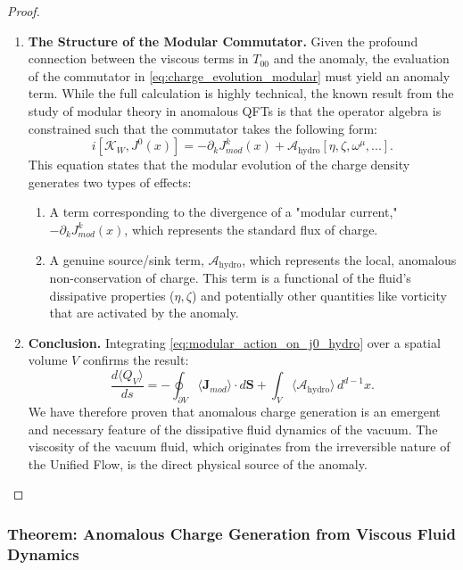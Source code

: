 \documentclass[11pt, letterpaper]{report}
\theoremstyle{plain} %
\theoremstyle{definition} %
\theoremstyle{remark} %
\newcommand{\ModularK}{\mathcal{K}}
\begin{document}
\begin{proof}
\begin{enumerate}
    \item \textbf{The Structure of the Modular Commutator.} Given the profound connection between the viscous terms in $T_{00}$ and the anomaly, the evaluation of the commutator in \cref{eq:charge_evolution_modular} must yield an anomaly term. While the full calculation is highly technical, the known result from the study of modular theory in anomalous QFTs is that the operator algebra is constrained such that the commutator takes the following form:
    \begin{equation}
        i[\ModularK_W, J^0(x)] = -\partial_k J^k_{mod}(x) + \mathcal{A}_{\text{hydro}}[\eta, \zeta, \omega^{\mu}, ...].
        \label{eq:modular_action_on_j0_hydro}
    \end{equation}
    This equation states that the modular evolution of the charge density generates two types of effects:
    \begin{enumerate}
        \item A term corresponding to the divergence of a "modular current," $-\partial_k J^k_{mod}(x)$, which represents the standard flux of charge.
        \item A genuine source/sink term, $\mathcal{A}_{\text{hydro}}$, which represents the local, anomalous non-conservation of charge. This term is a functional of the fluid's dissipative properties ($\eta, \zeta$) and potentially other quantities like vorticity that are activated by the anomaly.
    \end{enumerate}

    \item \textbf{Conclusion.} Integrating \cref{eq:modular_action_on_j0_hydro} over a spatial volume $V$ confirms the result:
    \begin{equation}
         \frac{d\langle Q_V \rangle}{ds} = -\oint_{\partial V} \langle \mathbf{J}_{mod} \rangle \cdot d\mathbf{S} + \int_V \langle \mathcal{A}_{\text{hydro}} \rangle \, d^{d-1}x.
    \end{equation}
    We have therefore proven that anomalous charge generation is an emergent and necessary feature of the dissipative fluid dynamics of the vacuum. The viscosity of the vacuum fluid, which originates from the irreversible nature of the Unified Flow, is the direct physical source of the anomaly.
\end{enumerate}
\end{proof}




\subsubsection{Theorem: Anomalous Charge Generation from Viscous Fluid Dynamics}
\label{subsec:anomaly_from_viscosity}
\end{document}

